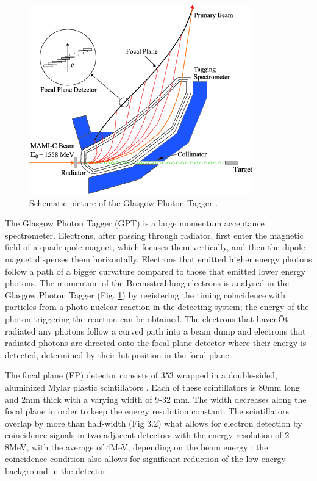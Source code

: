 \begin{figure}[H]
\begin{center}
\includegraphics[scale=0.8]{GlaTagger.png}
\caption{Schematic picture of the Glasgow Photon Tagger \cite{marcu}.}
\label{gpt}
\end{center}
\end{figure}

\indent The Glasgow Photon Tagger (GPT) is a large momentum acceptance spectrometer. Electrons, after passing through radiator, first enter the magnetic field of a quadrupole magnet, which focuses them vertically, and then the dipole magnet disperses them horizontally. Electrons that emitted higher energy photons follow a path of a bigger curvature compared to those that emitted lower energy photons. The momentum of the Bremsstrahlung electrons is analysed in the Glasgow Photon Tagger (Fig. \ref{gpt}) by registering the timing coincidence with particles from a photo nuclear reaction in the detecting system; the energy of the photon triggering the reaction can be obtained. The electrons that havenÕt radiated any photons follow a curved path into a beam dump and electrons that radiated photons are directed onto the focal plane detector where their energy is detected, determined by their hit position in the focal plane.

\indent The focal plane (FP) detector consists of 353 wrapped in a double-sided, aluminized Mylar plastic scintillators \cite{sjhall}. Each of these scintillators is 80mm long and 2mm thick with a varying width of 9-32 mm. The width decreases along the focal plane in order to keep the energy resolution constant. The scintillators overlap by more than half-width (Fig 3.2) what allows for electron detection by coincidence signals in two adjacent detectors with the energy resolution of 2-8MeV, with the average of 4MeV, depending on the beam energy \cite{mcgeorge}; the coincidence condition also allows for significant reduction of the low energy background in the detector.

